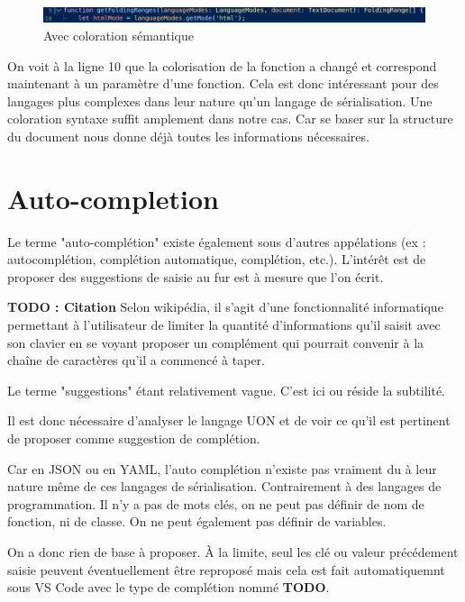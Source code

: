 \documentclass[
    iict, %
    il, %
]{heig-tb}
\begin{document}
\begin{figure}[!h]
    \begin{center}
        \includegraphics[width=15cm]{assets/figures/semantic-coloration-with.png}
    \end{center}
    \caption[Sans coloration sémantique ]{\label{semantic-coloration-with} Avec coloration sémantique }
\end{figure}

On voit à la ligne 10 que la colorisation de la fonction a changé et correspond maintenant à un paramètre d'une fonction.
Cela est donc intéressant pour des langages plus complexes dans leur nature qu'un langage de sérialisation. Une coloration syntaxe suffit amplement dans notre cas.
Car se baser sur la structure du document nous donne déjà toutes les informations nécessaires.

\section{Auto-completion}

Le terme "auto-complétion" existe également sous d'autres appélations (ex : autocomplétion, complétion automatique, complétion, etc.).
L'intérêt est de proposer des suggestions de saisie au fur est à mesure que l'on écrit.

\textbf{TODO : Citation}
Selon wikipédia, il s'agit d'une fonctionnalité informatique permettant à l'utilisateur de limiter la quantité d'informations qu'il saisit avec son clavier
en se voyant proposer un complément qui pourrait convenir à la chaîne de caractères qu'il a commencé à taper.

Le terme "suggestions" étant relativement vague. C'est ici ou réside la subtilité.

Il est donc nécessaire d'analyser le langage UON et de voir ce qu'il est pertinent de proposer comme suggestion de complétion.

Car en JSON ou en YAML, l'auto complétion n'existe pas vraiment du à leur nature même de ces langages de sérialisation.
Contrairement à des langages de programmation. Il n'y a pas de mots clés, on ne peut pas définir de nom de fonction, ni de classe. On ne peut également pas définir de variables.

On a donc rien de base à proposer. À la limite, seul les clé ou valeur précédement saisie peuvent éventuellement être reproposé mais cela est fait automatiquemnt sous VS Code
avec le type de complétion nommé \textbf{TODO}.
\end{document}

